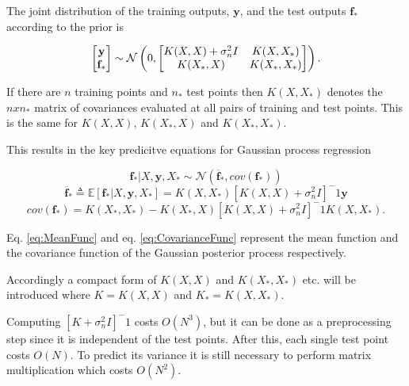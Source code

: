 \documentclass[12pt,a4paper]{report}
\theoremstyle{definition}
\begin{document}
The joint distribution of the training outputs, $\textbf{y}$, and the test outputs $\textbf{f}_{*}$ according to the prior is 

\begin{equation}
	\centering
	\begin{bmatrix}
		\textbf{y} \\
		\textbf{f}_{*}
	\end{bmatrix}
	\sim \mathcal{N} \left( 0,
	\begin{bmatrix}
		K(X, X) + \sigma_{n}^2I & K(X, X_{*}) \\
		K(X_{*},  X) & K(X_{*},  X_{*})
	\end{bmatrix} \right) .
	\label{eq:JointPriorDist}
\end{equation}

If there are $n$ training points and $n_{*}$ test points then $K(X, X_{*})$ denotes the $n x n_{*}$ matrix of covariances evaluated at all pairs of training and test points. 
This is the same for $K(X, X)$, $K(X_{*},  X)$ and $K(X_{*},  X_{*})$.

This results in the key predicitve equations for Gaussian process regression

\begin{equation}
	\textbf{f}_{*} | X, \textbf{y}, X_{*} \sim \mathcal{N}(\overline{\textbf{f}}_{*}, cov(\textbf{f}_{*}))
\end{equation}
\begin{equation}
	\overline{\textbf{f}}_{*} \triangleq \mathbb{E}[\textbf{f}_{*} | X, \textbf{y}, X_{*}] = K(X, X_{*})[K(X, X) +  \sigma_{n}^2I]^-1 \textbf{y}
	\label{eq:MeanFunc}
\end{equation}
\begin{equation}
	cov(\textbf{f}_{*}) = K(X_{*}, X_{*}) - K(X_{*}, X)[K(X, X) +  \sigma_{n}^2I]^-1 K(X, X_{*}).
	\label{eq:CovarianceFunc}
\end{equation}

Eq. \ref{eq:MeanFunc} and eq. \ref{eq:CovarianceFunc} represent the mean function and the covariance function of the Gaussian posterior process respectively. 

Accordingly a compact form of $K(X, X)$ and $K(X_{*}, X_{*})$ etc. will be introduced where $K = K(X, X)$ and $K_{*} = K(X, X_{*})$.

Computing $[K + \sigma_{n}^2I]^-1$ costs $O(N^3)$, but it can be done as a preprocessing step since it is independent of the test points. 
After this, each single test point costs $O(N)$. 
To predict its variance it is still necessary to perform matrix multiplication which costs $O(N^2)$.
\end{document}
